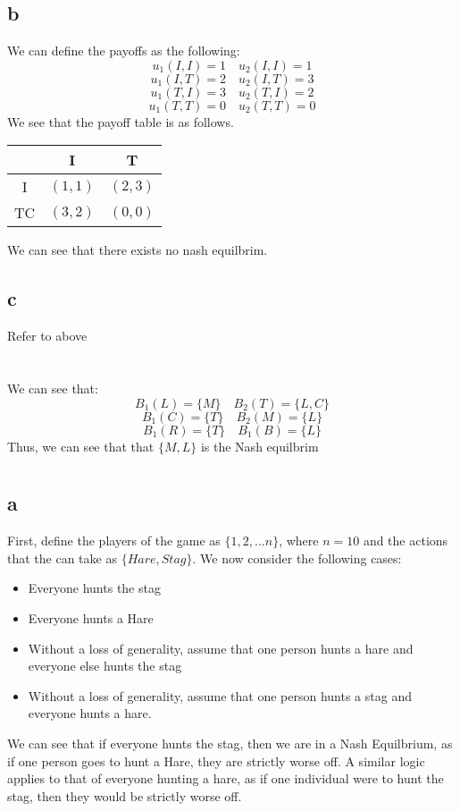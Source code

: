 \documentclass[11pt]{article}
\begin{document}
\subsection*{b}
We can define the payoffs as the following:
\[
u_1(I,I) = 1 \quad u_2(I, I) = 1
\]
\[
u_1(I, T) = 2 \quad u_2(I,T) = 3
\]
\[
u_1(T, I) = 3 \quad u_2(T, I) = 2
\]
\[
u_1(T,T) = 0 \quad u_2(T, T) = 0
\]
We see that the payoff table is as follows.
\begin{table}[H]
    \centering 
    \begin{tabular}{c|c|c}
        & I & T\\
        \hline
        I & $(1,1)$ & $(2,3)$\\
        TC & $(3,2)$ & $(0,0)$ 
    \end{tabular}
\end{table}
\noindent We can see that there exists no nash equilbrim. 
\subsection*{c}
Refer to above
\section{}
We can see that:
\[
B_1(L) = \{M\} \quad B_2(T) = \{L, C\}
\]
\[
B_1(C) = \{ T \} \quad B_2(M) = \{L\}
\]
\[
B_1(R) = \{T\} \quad B_1(B) = \{L\}
\]
Thus, we can see that that $\{M, L\}$ is the Nash equilbrim 
\section{}
\subsection*{a}
First, define the players of the game as $\{1, 2, \dots n\}$, where $n = 10$ and the actions that the can take as $\{Hare, Stag\}$. We now consider the following cases:
\begin{itemize}
    \item Everyone hunts the stag 
    \item Everyone hunts a Hare
    \item Without a loss of generality, assume that one person hunts a hare and everyone else hunts the stag
    \item Without a loss of generality, assume that one person hunts a stag and everyone hunts a hare. 
\end{itemize}
We can see that if everyone hunts the stag, then we are in a Nash Equilbrium, as if one person goes to hunt a Hare, they are strictly worse off. A similar logic applies to that of everyone hunting a hare, as if one individual were to hunt the stag, then they would be strictly worse off. 
\end{document}
